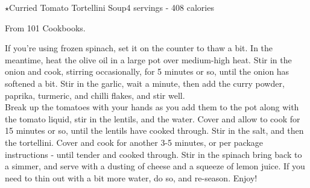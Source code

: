 \begin{recipe}{\texorpdfstring{$\star$}{str}Curried Tomato Tortellini Soup}{4 servings - 408 calories}{}

\freeform From 101 Cookbooks.


If you're using frozen spinach, set it on the counter to thaw a bit. In the meantime, heat the olive oil in a large pot over medium-high heat. Stir in the onion and cook, stirring occasionally, for 5 minutes or so, until the onion has softened a bit. Stir in the garlic, wait a minute, then add the curry powder, paprika, turmeric, and chilli flakes, and stir well.\\

Break up the tomatoes with your hands as you add them to the pot along with the tomato liquid, stir in the lentils, and the water. Cover and allow to cook for 15 minutes or so, until the lentils have cooked through. Stir in the salt, and then the tortellini. Cover and cook for another 3-5 minutes, or per package instructions - until tender and cooked through. Stir in the spinach bring back to a simmer, and serve with a dusting of cheese and a squeeze of lemon juice. If you need to thin out with a bit more water, do so, and re-season. Enjoy!\\

\end{recipe}